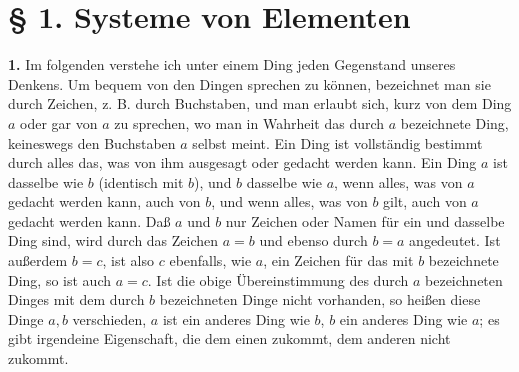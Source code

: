 \documentclass[11pt]{article}
\begin{document}
\section*{§ 1. Systeme von Elementen}

\noindent\textbf{1.} Im folgenden verstehe ich unter einem Ding jeden Gegenstand unseres Denkens. Um bequem von den Dingen sprechen zu können, bezeichnet man sie durch Zeichen, z. B. durch Buchstaben, und man erlaubt sich, kurz von dem Ding $a$ oder gar von $a$ zu sprechen, wo man in Wahrheit das durch $a$ bezeichnete Ding, keineswegs den Buchstaben $a$ selbst meint. Ein Ding ist vollständig bestimmt durch alles das, was von ihm ausgesagt oder gedacht werden kann. Ein Ding $a$ ist dasselbe wie $b$ (identisch mit $b$), und $b$ dasselbe wie $a$, wenn alles, was von $a$ gedacht werden kann, auch von $b$, und wenn alles, was von $b$ gilt, auch von $a$ gedacht werden kann. Daß $a$ und $b$ nur Zeichen oder Namen für ein und dasselbe Ding sind, wird durch das Zeichen $a=b$ und ebenso durch $b=a$ angedeutet. Ist außerdem $b=c$, ist also $c$ ebenfalls, wie $a$, ein Zeichen für das mit $b$ bezeichnete Ding, so ist auch $a=c$. Ist die obige Übereinstimmung des durch $a$ bezeichneten Dinges mit dem durch $b$ bezeichneten Dinge nicht vorhanden, so heißen diese Dinge $a,b$ verschieden, $a$ ist ein anderes Ding wie $b$, $b$ ein anderes Ding wie $a$; es gibt irgendeine Eigenschaft, die dem einen zukommt, dem anderen nicht zukommt.
\end{document}

